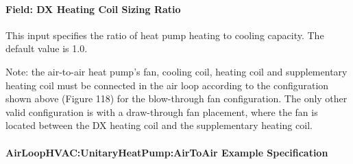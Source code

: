 \paragraph{Field: DX Heating Coil Sizing Ratio}\label{field-dx-heating-coil-sizing-ratio-0103}

This input specifies the ratio of heat pump heating to cooling capacity. The default value is 1.0.


Note: the air-to-air heat pump's fan, cooling coil, heating coil and supplementary heating coil must be connected in the air loop according to the configuration shown above (Figure 118) for the blow-through fan configuration. The only other valid configuration is with a draw-through fan placement, where the fan is located between the DX heating coil and the supplementary heating coil.

\paragraph{AirLoopHVAC:UnitaryHeatPump:AirToAir Example Specification}\label{airloophvacunitaryheatpumpairtoair-example-specification}

